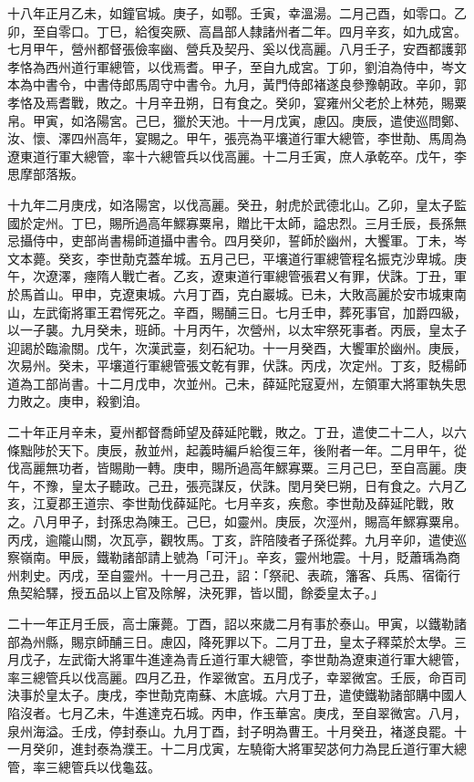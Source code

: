 \begin{pinyinscope}
 十八年正月乙未，如鐘官城。庚子，如鄠。壬寅，幸溫湯。二月己酉，如零口。乙卯，至自零口。丁巳，給復突厥、高昌部人隸諸州者二年。四月辛亥，如九成宮。七月甲午，營州都督張儉率幽、營兵及契丹、奚以伐高麗。八月壬子，安酉都護郭孝恪為西州道行軍總管，以伐焉耆。甲子，至自九成宮。丁卯，劉洎為侍中，岑文本為中書令，中書侍郎馬周守中書令。九月，黃門侍郎褚遂良參豫朝政。辛卯，郭孝恪及焉耆戰，敗之。十月辛丑朔，日有食之。癸卯，宴雍州父老於上林苑，賜粟帛。甲寅，如洛陽宮。己巳，獵於天池。十一月戊寅，慮囚。庚辰，遣使巡問鄭、汝、懷、澤四州高年，宴賜之。甲午，張亮為平壤道行軍大總管，李世勣、馬周為遼東道行軍大總管，率十六總管兵以伐高麗。十二月壬寅，庶人承乾卒。戊午，李思摩部落叛。



 十九年二月庚戌，如洛陽宮，以伐高麗。癸丑，射虎於武德北山。乙卯，皇太子監國於定州。丁巳，賜所過高年鰥寡粟帛，贈比干太師，謚忠烈。三月壬辰，長孫無忌攝侍中，吏部尚書楊師道攝中書令。四月癸卯，誓師於幽州，大饗軍。丁未，岑文本薨。癸亥，李世勣克蓋牟城。五月己巳，平壤道行軍總管程名振克沙卑城。庚午，次遼澤，瘞隋人戰亡者。乙亥，遼東道行軍總管張君乂有罪，伏誅。丁丑，軍於馬首山。甲申，克遼東城。六月丁酉，克白巖城。已未，大敗高麗於安市城東南山，左武衛將軍王君愕死之。辛酉，賜酺三日。七月壬申，葬死事官，加爵四級，以一子襲。九月癸未，班師。十月丙午，次營州，以太牢祭死事者。丙辰，皇太子迎謁於臨渝關。戊午，次漢武臺，刻石紀功。十一月癸酉，大饗軍於幽州。庚辰，次易州。癸未，平壤道行軍總管張文乾有罪，伏誅。丙戌，次定州。丁亥，貶楊師道為工部尚書。十二月戊申，次並州。己未，薛延陀寇夏州，左領軍大將軍執失思力敗之。庚申，殺劉洎。



 二十年正月辛未，夏州都督喬師望及薛延陀戰，敗之。丁丑，遣使二十二人，以六條黜陟於天下。庚辰，赦並州，起義時編戶給復三年，後附者一年。二月甲午，從伐高麗無功者，皆賜勛一轉。庚申，賜所過高年鰥寡粟。三月己巳，至自高麗。庚午，不豫，皇太子聽政。己丑，張亮謀反，伏誅。閏月癸巳朔，日有食之。六月乙亥，江夏郡王道宗、李世勣伐薛延陀。七月辛亥，疾愈。李世勣及薛延陀戰，敗之。八月甲子，封孫忠為陳王。己巳，如靈州。庚辰，次涇州，賜高年鰥寡粟帛。丙戌，逾隴山關，次瓦亭，觀牧馬。丁亥，許陪陵者子孫從葬。九月辛卯，遣使巡察嶺南。甲辰，鐵勒諸部請上號為「可汗」。辛亥，靈州地震。十月，貶蕭瑀為商州刺史。丙戌，至自靈州。十一月己丑，詔：「祭祀、表疏，籓客、兵馬、宿衛行魚契給驛，授五品以上官及除解，決死罪，皆以聞，餘委皇太子。」



 二十一年正月壬辰，高士廉薨。丁酉，詔以來歲二月有事於泰山。甲寅，以鐵勒諸部為州縣，賜京師酺三日。慮囚，降死罪以下。二月丁丑，皇太子釋菜於太學。三月戊子，左武衛大將軍牛進達為青丘道行軍大總管，李世勣為遼東道行軍大總管，率三總管兵以伐高麗。四月乙丑，作翠微宮。五月戊子，幸翠微宮。壬辰，命百司決事於皇太子。庚戌，李世勣克南蘇、木底城。六月丁丑，遣使鐵勒諸部購中國人陷沒者。七月乙未，牛進達克石城。丙申，作玉華宮。庚戌，至自翠微宮。八月，泉州海溢。壬戌，停封泰山。九月丁酉，封子明為曹王。十月癸丑，褚遂良罷。十一月癸卯，進封泰為濮王。十二月戊寅，左驍衛大將軍契苾何力為昆丘道行軍大總管，率三總管兵以伐龜茲。




\end{pinyinscope}
